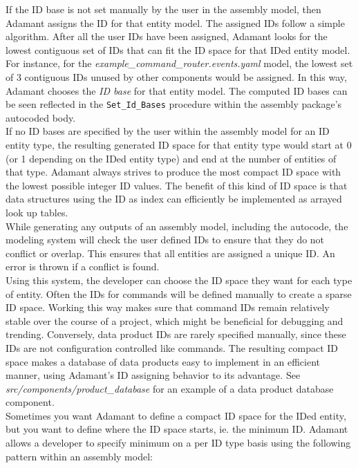 If the ID base is not set manually by the user in the assembly model, then Adamant assigns the ID for that entity model. The assigned IDs follow a simple algorithm. After all the user IDs have been assigned, Adamant looks for the lowest contiguous set of IDs that can fit the ID space for that IDed entity model. For instance, for the \textit{example\_command\_router.events.yaml} model, the lowest set of 3 contiguous IDs unused by other components would be assigned. In this way, Adamant chooses the \textit{ID base} for that entity model. The computed ID bases can be seen reflected in the \texttt{Set\_Id\_Bases} procedure within the assembly package's autocoded body. \\

If no ID bases are specified by the user within the assembly model for an ID entity type, the resulting generated ID space for that entity type would start at 0 (or 1 depending on the IDed entity type) and end at the number of entities of that type. Adamant always strives to produce the most compact ID space with the lowest possible integer ID values. The benefit of this kind of ID space is that data structures using the ID as index can efficiently be implemented as arrayed look up tables. \\

While generating any outputs of an assembly model, including the autocode, the modeling system will check the user defined IDs to ensure that they do not conflict or overlap. This ensures that all entities are assigned a unique ID. An error is thrown if a conflict is found. \\

Using this system, the developer can choose the ID space they want for each type of entity. Often the IDs for commands will be defined manually to create a sparse ID space. Working this way makes sure that command IDs remain relatively stable over the course of a project, which might be beneficial for debugging and trending. Conversely, data product IDs are rarely specified manually, since these IDs are not configuration controlled like commands. The resulting compact ID space makes a database of data products easy to implement in an efficient manner, using Adamant's ID assigning behavior to its advantage. See \textit{src/components/product\_database} for an example of a data product database component. \\

Sometimes you want Adamant to define a compact ID space for the IDed entity, but you want to define where the ID space starts, ie. the minimum ID. Adamant allows a developer to specify minimum on a per ID type basis using the following pattern within an assembly model: \\

